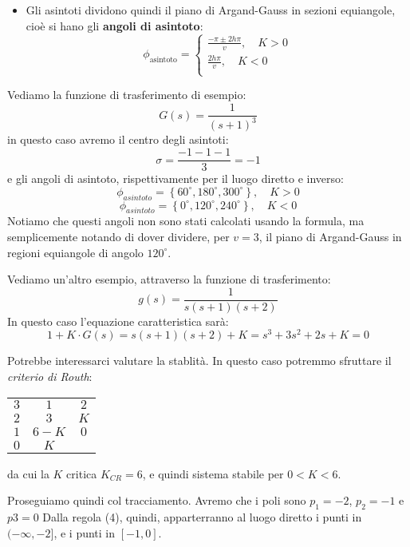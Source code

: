 \documentclass[a4paper,11pt]{article}
\begin{document}
\begin{enumerate}
\begin{itemize}
			\item Gli asintoti dividono quindi il piano di Argand-Gauss in sezioni equiangole, cioè si hano gli \textbf{angoli di asintoto}:
				\[
					\phi_\text{asintoto} =
					\begin{cases}
						\frac{-\pi \pm 2 h \pi}{v}, \quad K > 0 \\
						\frac{2 h \pi}{v}, \quad K < 0 \\
					\end{cases}
				\]
		\end{itemize}

		\par\medskip
		\noindent
		\textbf{}

		Vediamo la funzione di trasferimento di esempio:
		$$
		G(s) = \frac{1}{(s + 1)^3}
		$$
		in questo caso avremo il centro degli asintoti:
		$$
		\sigma = \frac{-1 -1 -1}{3} = -1
		$$
		e gli angoli di asintoto, rispettivamente per il luogo diretto e inverso:
		$$
		\phi_{asintoto} = \left\{ 60^\circ, 180^\circ, 300^\circ \right\}, \quad K > 0
		$$
		$$
		\phi_{asintoto} = \left\{ 0^\circ, 120^\circ, 240^\circ \right\}, \quad K < 0
		$$
		Notiamo che questi angoli non sono stati calcolati usando la formula, ma semplicemente notando di dover dividere, per $v = 3$, il piano di Argand-Gauss in regioni equiangole di angolo $120^\circ$.

		\par\medskip
		\noindent
		\textbf{}

		Vediamo un'altro esempio, attraverso la funzione di trasferimento:
		$$
		g(s) = \frac{1}{s(s + 1)(s + 2)}
		$$
		In questo caso l'equazione caratteristica sarà:
		$$
		1 + K \cdot G(s) = s ( s + 1) ( s + 2) + K = s^3 + 3s^2 + 2s + K = 0
		$$

		Potrebbe interessarci valutare la stablità.
		In questo caso potremmo sfruttare il \textit{criterio di Routh}:
		\begin{table}[H]
			\center 
			\begin{tabular} { c | c c}
				$3$ & $1$ & $2$ \\
				$2$ & $3$ & $K$ \\
				$1$ & $6 - K$ & $0$ \\
				$0$ & $K$
			\end{tabular}
		\end{table}
		da cui la $K$ critica $K_{CR} = 6$, e quindi sistema stabile per $0 < K < 6$.

		Proseguiamo quindi col tracciamento.
		Avremo che i poli sono $p_1 = -2$, $p_2 = -1$ e $p3 = 0$
		Dalla regola (4), quindi, apparterranno al luogo diretto i punti in $(-\infty, -2]$, e i punti in $[-1, 0]$.


\end{enumerate}
\end{document}
